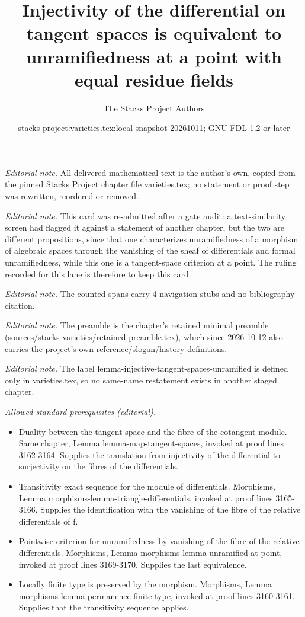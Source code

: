 \documentclass[10pt,a4paper]{amsart}
\title{Injectivity of the differential on tangent spaces is equivalent to unramifiedness at a point with equal residue fields}
\author{The Stacks Project Authors}
\date{stacks-project:varieties.tex:local-snapshot-20261011; GNU FDL 1.2 or later}
\theoremstyle{plain}
\theoremstyle{definition}
\theoremstyle{remark}
\numberwithin{equation}{subsection}
\begin{document}
\maketitle
\noindent\textit{Editorial note.} All delivered mathematical text is the author's own, copied from the pinned Stacks Project chapter file varieties.tex; no statement or proof step was rewritten, reordered or removed.\par\medskip
\noindent\textit{Editorial note.} This card was re-admitted after a gate audit: a text-similarity screen had flagged it against a statement of another chapter, but the two are different propositions, since that one characterizes unramifiedness of a morphism of algebraic spaces through the vanishing of the sheaf of differentials and formal unramifiedness, while this one is a tangent-space criterion at a point. The ruling recorded for this lane is therefore to keep this card.\par\medskip
\noindent\textit{Editorial note.} The counted spans carry 4 navigation stubs and no bibliography citation.\par\medskip
\noindent\textit{Editorial note.} The preamble is the chapter's retained minimal preamble (sources/stacks-varieties/retained-preamble.tex), which since 2026-10-12 also carries the project's own reference/slogan/history definitions.\par\medskip
\noindent\textit{Editorial note.} The label lemma-injective-tangent-spaces-unramified is defined only in varieties.tex, so no same-name restatement exists in another staged chapter.\par\medskip
\noindent\textit{Allowed standard prerequisites (editorial).}\begin{itemize}
\item Duality between the tangent space and the fibre of the cotangent module. Same chapter, Lemma lemma-map-tangent-spaces, invoked at proof lines 3162-3164. Supplies the translation from injectivity of the differential to surjectivity on the fibres of the differentials.
\item Transitivity exact sequence for the module of differentials. Morphisms, Lemma morphisms-lemma-triangle-differentials, invoked at proof lines 3165-3166. Supplies the identification with the vanishing of the fibre of the relative differentials of f.
\item Pointwise criterion for unramifiedness by vanishing of the fibre of the relative differentials. Morphisms, Lemma morphisms-lemma-unramified-at-point, invoked at proof lines 3169-3170. Supplies the last equivalence.
\item Locally finite type is preserved by the morphism. Morphisms, Lemma morphisms-lemma-permanence-finite-type, invoked at proof lines 3160-3161. Supplies that the transitivity sequence applies.
\end{itemize}\medskip
\end{document}
